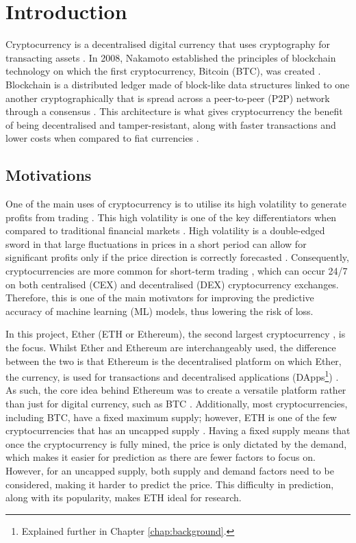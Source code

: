 \documentclass[ %
                    author={Raj Dhakan},
                supervisor={Dr. Ayush Joshi},
                    degree={MSc},
                     title={Ethereum Price Prediction using Internal and External Factors},
                  subtitle={},
                      type={},
                      year={2025}]{dissertation}
\begin{document}

\chapter{Introduction}
\label{chap:introduction}

Cryptocurrency is a decentralised digital currency that uses cryptography for transacting assets \cite{RN126}. In 2008, Nakamoto established the principles of blockchain technology on which the first cryptocurrency, Bitcoin (BTC), was created \cite{RN126}. Blockchain is a distributed ledger made of block-like data structures linked to one another cryptographically that is spread across a peer-to-peer (P2P) network through a consensus \cite{RN126}. This architecture is what gives cryptocurrency the benefit of being decentralised and tamper-resistant, along with faster transactions and lower costs when compared to fiat currencies \cite{RN131}.

\section{Motivations}

One of the main uses of cryptocurrency is to utilise its high volatility to generate profits from trading \cite{kumar2024cryptopulse}. This high volatility is one of the key differentiators when compared to traditional financial markets \cite{kumar2024cryptopulse}. High volatility is a double-edged sword in that large fluctuations in prices in a short period can allow for significant profits only if the price direction is correctly forecasted \cite{RN135}. Consequently, cryptocurrencies are more common for short-term trading \cite{delfabbro2021psychology}, which can occur 24/7 on both centralised (CEX) and decentralised (DEX) cryptocurrency exchanges. Therefore, this is one of the main motivators for improving the predictive accuracy of machine learning (ML) models, thus lowering the risk of loss. 

In this project, Ether (ETH or Ethereum), the second largest cryptocurrency \cite{RN78}, is the focus. Whilst Ether and Ethereum are interchangeably used, the difference between the two is that Ethereum is the decentralised platform on which Ether, the currency, is used for transactions and decentralised applications (DApps\footnote{Explained further in Chapter \ref{chap:background}.}) \cite{RN136}. As such, the core idea behind Ethereum was to create a versatile platform rather than just for digital currency, such as BTC \cite{RN138}. Additionally, most cryptocurrencies, including BTC, have a fixed maximum supply; however, ETH is one of the few cryptocurrencies that has an uncapped supply \cite{RN136}. Having a fixed supply means that once the cryptocurrency is fully mined, the price is only dictated by the demand, which makes it easier for prediction as there are fewer factors to focus on. However, for an uncapped supply, both supply and demand factors need to be considered, making it harder to predict the price. This difficulty in prediction, along with its popularity, makes ETH ideal for research.
\end{document}
